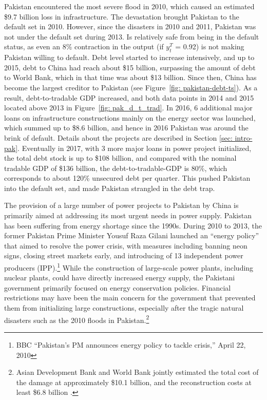 Pakistan encountered the most severe flood in 2010, which caused an estimated \$9.7 billion loss in infrastructure. The devastation brought Pakistan to the default set in 2010.
However, since the disasters in 2010 and 2011, Pakistan was not under the default set during 2013. Is relatively safe from being in the default status, as even an 8\% contraction in the output (if $y^T_t$ = 0.92) is not making Pakistan willing to default. Debt level started to increase intensively, and up to 2015, debt to China had reach about \$15 billion, surpassing the amount of debt to World Bank, which in that time was about \$13 billion. Since then, China has become the largest creditor to Pakistan (see Figure~\ref{fig: pakistan-debt-ts}). As a result, debt-to-tradable GDP increased, and both data points in 2014 and 2015 located above 2013 in Figure~\ref{fig: pak_d_t_trad}. In 2016, 6 additional major loans on infrastructure constructions mainly on the energy sector was launched, which summed up to \$8.6 billion, and hence in 2016 Pakistan was around the brink of default. Details about the projects are described in Section \ref{sec: intro-pak}.
Eventually in 2017, with 3 more major loans in power project initialized, the total debt stock is up to \$108 billion, and compared with the nominal tradable GDP of \$136 billion, the debt-to-tradable-GDP is 80\%, which corresponds to about 120\% unsecured debt per quarter. This pushed Pakistan into the default set, and made Pakistan strangled in the debt trap.

The provision of a large number of power projects to Pakistan by China is primarily aimed at addressing its most urgent needs in power supply. Pakistan has been suffering from energy shortage since the 1990s. During 2010 to 2013, the former Pakistan Prime Minister Yousuf Raza Gilani launched an ``energy policy'' that aimed to resolve the power crisis, with measures including banning neon signs, closing street markets early, and introducing of 13 independent power producers (IPP).\footnote{
    BBC ``Pakistan's PM announces energy policy to tackle crisis,'' April 22, 2010
}
While the construction of large-scale power plants, including nuclear plants, could have directly increased energy supply, the Pakistani government primarily focused on energy conservation policies. Financial restrictions may have been the main concern for the government that prevented them from initializing large constructions, especially after the tragic natural disasters such as the 2010 floods in Pakistan.\footnote{
    Asian Development Bank and World Bank jointly estimated the total cost of the damage at approximately \$10.1 billion, and the reconstruction costs at least \$6.8 billion \citep{pakistan-flood}.
}

